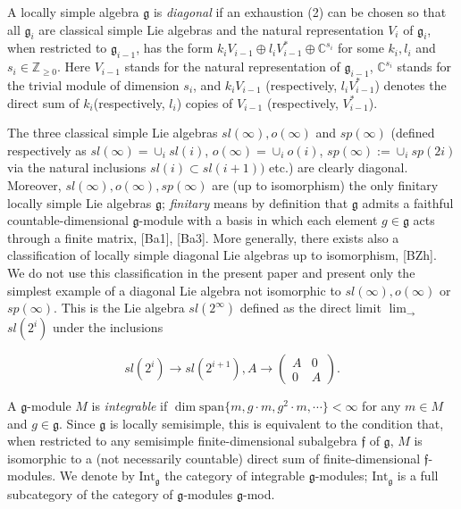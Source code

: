 \documentclass{birkmult}
\renewcommand{\gg}{\mathfrak{g}}
\renewcommand{\span}{\mathrm{span}}
\newcommand{\ds}{\displaystyle}
\newcommand{\Int}{\mathrm{Int}}
\begin{document}
 A locally simple algebra $\gg$ is \textit{diagonal} if an exhaustion (2) can be chosen so that all $\gg_i$ are classical simple Lie algebras and the natural representation $V_i$ of $\gg_i$, when restricted to $\gg_{i-1}$, has the form $k_iV_{i-1}\oplus l_iV_{i-1}^*\oplus\mathbb{C}^{s_i}$ for some $k_i, l_i$ and $s_i\in\mathbb{Z}_{\geq 0}$. Here $V_{i-1}$ stands for the natural representation of $\gg_{i-1}$, $\mathbb{C}^{s_i}$ stands for the trivial module of dimension $s_i$, and $\ds k_iV_{i-1}$ (respectively, $l_iV_{i-1}^*$) denotes the direct sum of $k_i$(respectively, $l_i$) copies of $V_{i-1}$ (respectively, $V_{i-1}^*$).

The three classical simple Lie algebras $sl(\infty), o(\infty)$
and $sp(\infty)$ (defined respectively as $\displaystyle
 sl(\infty)=\cup_i sl(i)$,  $\displaystyle o(\infty)=\cup_i
 o(i)$, $\ds sp(\infty):=\cup_isp(2i)$ via the natural inclusions
 $sl(i)\subset sl(i+1))$ etc.) are clearly diagonal. Moreover,
 $sl(\infty), o(\infty),sp(\infty)$ are (up to isomorphism) the only finitary locally simple Lie algebras $\gg$; \textit{finitary}
means
 by definition that $\gg$ admits a faithful countable-dimensional
 $\gg$-module with a basis in which each element $g\in\gg$ acts
 through a finite matrix,  [Ba1], [Ba3].  More generally, there exists
 also a classification of locally simple diagonal Lie algebras up to
 isomorphism, [BZh]. We do not use this classification in the present
 paper and present only the simplest example of a diagonal Lie algebra
 not isomorphic to $sl(\infty), o(\infty)$ or $sp(\infty)$. This is
 the Lie algebra $sl(2^{\infty})$ defined as the direct limit
 $\ds\lim_{\to}$ $  sl(2^i)$ under the inclusions


\[ sl(2^i) \rightarrow sl(2^{i+1}), A\rightarrow\left( \begin{array}{cc}
A & 0  \\
0 & A  \end{array} \right).\]


A $\gg$-module $M$ is \textit{integrable} if 
$\dim\span\{m, g\cdot m,g^2\cdot m,\cdots\}<\infty$ for any $m\in M$ and $g\in\gg$. 
Since $\gg$ is locally semisimple, this is equivalent to the condition that,
 when restricted to any semisimple finite-dimensional subalgebra $\mathfrak{f}$ of $\gg$, $M$ is isomorphic to a (not necessarily countable) direct sum of finite-dimensional $\mathfrak{f}$-modules. We denote by $\Int_\gg$ the category of integrable $\gg$-modules; $\Int_\gg$
is a full subcategory of the category of $\gg$-modules $\gg$-mod.
\end{document}
